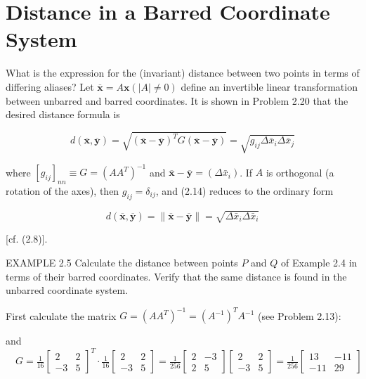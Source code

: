 \documentclass[10pt]{article}
\begin{document}
\section*{Distance in a Barred Coordinate System}
What is the expression for the (invariant) distance between two points in terms of differing aliases? Let $\overline{\mathbf{x}}=A \mathbf{x}(|A| \neq 0)$ define an invertible linear transformation between unbarred and barred coordinates. It is shown in Problem 2.20 that the desired distance formula is


\begin{equation*}
d(\overline{\mathbf{x}}, \overline{\mathbf{y}})=\sqrt{(\overline{\mathbf{x}}-\overline{\mathbf{y}})^{T} G(\overline{\mathbf{x}}-\overline{\mathbf{y}})}=\sqrt{g_{i j} \Delta \bar{x}_{i} \Delta \bar{x}_{j}} \tag{2.14}
\end{equation*}


where $\left[g_{i j}\right]_{n n} \equiv G=\left(A A^{T}\right)^{-1}$ and $\overline{\mathbf{x}}-\overline{\mathbf{y}}=\left(\Delta \bar{x}_{i}\right)$. If $A$ is orthogonal (a rotation of the axes), then $g_{i j}=\delta_{i j}$, and (2.14) reduces to the ordinary form

$$
d(\overline{\mathbf{x}}, \overline{\mathbf{y}})=\|\overline{\mathbf{x}}-\overline{\mathbf{y}}\|=\sqrt{\Delta \bar{x}_{i} \Delta \bar{x}_{i}}
$$

[cf. (2.8)].

EXAMPLE 2.5 Calculate the distance between points $P$ and $Q$ of Example 2.4 in terms of their barred coordinates. Verify that the same distance is found in the unbarred coordinate system.

First calculate the matrix $G=\left(A A^{T}\right)^{-1}=\left(A^{-1}\right)^{T} A^{-1}$ (see Problem 2.13):

and $\quad G=\frac{1}{16}\left[\begin{array}{rr}2 & 2 \\ -3 & 5\end{array}\right]^{T} \cdot \frac{1}{16}\left[\begin{array}{rr}2 & 2 \\ -3 & 5\end{array}\right]=\frac{1}{256}\left[\begin{array}{rr}2 & -3 \\ 2 & 5\end{array}\right]\left[\begin{array}{rr}2 & 2 \\ -3 & 5\end{array}\right]=\frac{1}{256}\left[\begin{array}{rr}13 & -11 \\ -11 & 29\end{array}\right]$
\end{document}
